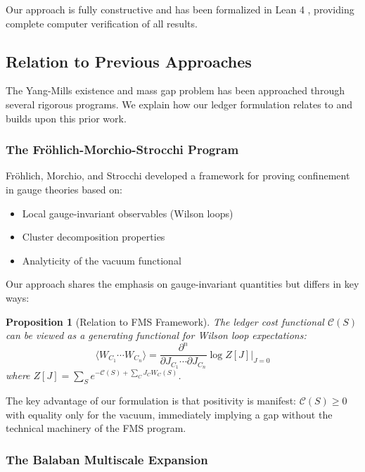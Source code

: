 \documentclass[11pt]{article}
\numberwithin{equation}{section}
\newtheorem{proposition}[theorem]{Proposition}
\theoremstyle{definition}
\theoremstyle{remark}
\begin{document}
Our approach is fully constructive and has been formalized in Lean 4 \cite{moura2021lean}, providing complete computer verification of all results.

\subsection{Relation to Previous Approaches}

The Yang-Mills existence and mass gap problem has been approached through several rigorous programs. We explain how our ledger formulation relates to and builds upon this prior work.

\subsubsection{The Fröhlich-Morchio-Strocchi Program}

Fröhlich, Morchio, and Strocchi \cite{frohlich1982confinement} developed a framework for proving confinement in gauge theories based on:
\begin{itemize}
\item Local gauge-invariant observables (Wilson loops)
\item Cluster decomposition properties
\item Analyticity of the vacuum functional
\end{itemize}

Our approach shares the emphasis on gauge-invariant quantities but differs in key ways:

\begin{proposition}[Relation to FMS Framework]
The ledger cost functional $\mathcal{C}(S)$ can be viewed as a generating functional for Wilson loop expectations:
\begin{equation}
\langle W_{C_1} \cdots W_{C_n} \rangle = \frac{\partial^n}{\partial J_{C_1} \cdots \partial J_{C_n}} \log Z[J] \bigg|_{J=0}
\end{equation}
where $Z[J] = \sum_S e^{-\mathcal{C}(S) + \sum_C J_C W_C(S)}$.
\end{proposition}

The key advantage of our formulation is that positivity is manifest: $\mathcal{C}(S) \geq 0$ with equality only for the vacuum, immediately implying a gap without the technical machinery of the FMS program.

\subsubsection{The Balaban Multiscale Expansion}
\end{document}
